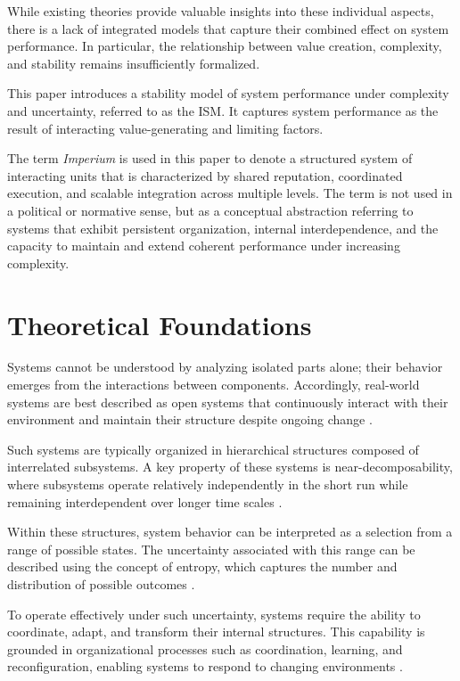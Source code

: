\documentclass[11pt,a4paper]{article}
\theoremstyle{definition}
\begin{document}
While existing theories provide valuable insights into these individual aspects, there is a lack of integrated models that capture their combined effect on system performance.
In particular, the relationship between value creation, complexity, and stability remains insufficiently formalized.

This paper introduces a stability model of system performance under complexity and uncertainty, referred to as the \acf{ISM}.
It captures system performance as the result of interacting value-generating and limiting factors.

The term \textit{Imperium} is used in this paper to denote a structured system of interacting units that is characterized by shared reputation, coordinated execution, and scalable integration across multiple levels.
The term is not used in a political or normative sense, but as a conceptual abstraction referring to systems that exhibit persistent organization, internal interdependence, and the capacity to maintain and extend coherent performance under increasing complexity.


\section{Theoretical Foundations}
\label{sec:foundations}

Systems cannot be understood by analyzing isolated parts alone; their behavior emerges from the interactions between components.
Accordingly, real-world systems are best described as open systems that continuously interact with their environment and maintain their structure despite ongoing change \parencite{bertalanffy1968}.

Such systems are typically organized in hierarchical structures composed of interrelated subsystems.
A key property of these systems is near-decomposability, where subsystems operate relatively independently in the short run while remaining interdependent over longer time scales \parencite{simon1962}.

Within these structures, system behavior can be interpreted as a selection from a range of possible states.
The uncertainty associated with this range can be described using the concept of entropy, which captures the number and distribution of possible outcomes \parencite{shannon1948a, shannon1948b}.

To operate effectively under such uncertainty, systems require the ability to coordinate, adapt, and transform their internal structures.
This capability is grounded in organizational processes such as coordination, learning, and reconfiguration, enabling systems to respond to changing environments \parencite{teece1997}.
\end{document}
